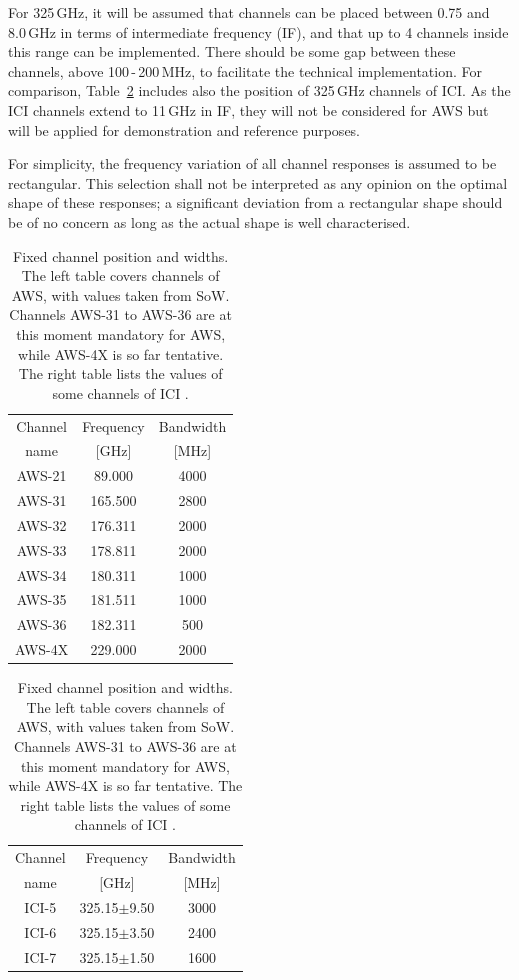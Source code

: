 \documentclass[12pt]{article}
\begin{document}
For 325\,GHz, it will be assumed that channels can be placed between 0.75 and
8.0\,GHz in terms of intermediate frequency (IF), and that up to 4 channels
inside this range can be implemented. There should be some gap between these
channels, above 100\,-\,200\,MHz, to facilitate the technical implementation.
For comparison, Table~\ref{tab:fixed:chs} includes also the position of 
325\,GHz channels of ICI. As the ICI channels extend to 11\,GHz in IF, they will not
be considered for AWS but will be applied for demonstration and reference
purposes.

For simplicity, the frequency variation of all channel responses is assumed to
be rectangular. This selection shall not be interpreted as any opinion on the
optimal shape of these responses; a significant deviation from a rectangular
shape should be of no concern as long as the actual shape is well
characterised.

\begin{table}[!b]
  \begin{minipage}[b]{0.5\linewidth}
  \centering  
  \begin{tabular}[c]{c|c|c}
    Channel & Frequency   & Bandwidth \\
    name    & [GHz] &  [MHz] \\
    \hline
    AWS-21  & \phantom{0}89.000 & 4000\\
    AWS-31  & 165.500 & 2800\\
    AWS-32  & 176.311 & 2000\\
    AWS-33  & 178.811 & 2000\\
    AWS-34  & 180.311 & 1000\\
    AWS-35  & 181.511 & 1000\\
    AWS-36  & 182.311 & \phantom{0}500\\
    AWS-4X  & 229.000 & 2000\\
    \hline
  \end{tabular}
  \end{minipage}%
  \begin{minipage}[b]{0.5\linewidth}
  \centering  
  \begin{tabular}[c]{c|c|c}
    Channel & Frequency   & Bandwidth \\
    name    & [GHz] &  [MHz] \\
    \hline
    ICI-5  & 325.15$\pm$9.50 & 3000\\
    ICI-6  & 325.15$\pm$3.50 & 2400\\
    ICI-7  & 325.15$\pm$1.50 & 1600\\
    \hline
  \end{tabular}
  \end{minipage}  
  \caption{Fixed channel position and widths. The left table covers channels of
    AWS, with values taken from SoW. Channels AWS-31 to AWS-36 are at this
    moment mandatory for AWS, while AWS-4X is so far tentative. The right table
    lists the values of some channels of ICI \citep{eriksson:towar:20}.}
  \label{tab:fixed:chs}
\end{table}
\end{document}
